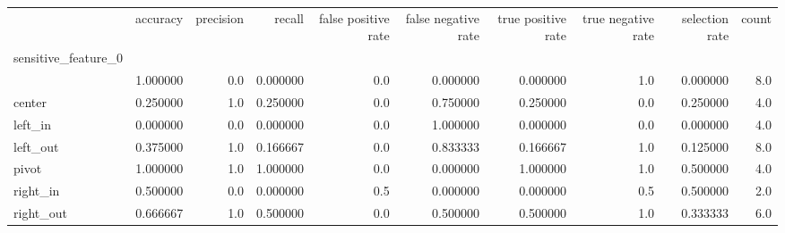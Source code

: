 \begin{tabular}{lrrrrrrrrr}
\toprule
{} &  accuracy &  precision &    recall &  false positive rate &  false negative rate &  true positive rate &  true negative rate &  selection rate &  count \\
sensitive\_feature\_0 &           &            &           &                      &                      &                     &                     &                 &        \\
\midrule
                    &  1.000000 &        0.0 &  0.000000 &                  0.0 &             0.000000 &            0.000000 &                 1.0 &        0.000000 &    8.0 \\
center              &  0.250000 &        1.0 &  0.250000 &                  0.0 &             0.750000 &            0.250000 &                 0.0 &        0.250000 &    4.0 \\
left\_in             &  0.000000 &        0.0 &  0.000000 &                  0.0 &             1.000000 &            0.000000 &                 0.0 &        0.000000 &    4.0 \\
left\_out            &  0.375000 &        1.0 &  0.166667 &                  0.0 &             0.833333 &            0.166667 &                 1.0 &        0.125000 &    8.0 \\
pivot               &  1.000000 &        1.0 &  1.000000 &                  0.0 &             0.000000 &            1.000000 &                 1.0 &        0.500000 &    4.0 \\
right\_in            &  0.500000 &        0.0 &  0.000000 &                  0.5 &             0.000000 &            0.000000 &                 0.5 &        0.500000 &    2.0 \\
right\_out           &  0.666667 &        1.0 &  0.500000 &                  0.0 &             0.500000 &            0.500000 &                 1.0 &        0.333333 &    6.0 \\
\bottomrule
\end{tabular}
